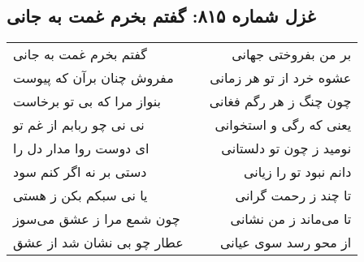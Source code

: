 \begin{center}
\section*{غزل شماره ۸۱۵: گفتم بخرم غمت به جانی}
\label{sec:815}
\begin{longtable}{l p{0.5cm} r}
گفتم بخرم غمت به جانی
&&
بر من بفروختی جهانی
\\
مفروش چنان برآن که پیوست
&&
عشوه خرد از تو هر زمانی
\\
بنواز مرا که بی تو برخاست
&&
چون چنگ ز هر رگم فغانی
\\
نی نی چو ربابم از غم تو
&&
یعنی که رگی و استخوانی
\\
ای دوست روا مدار دل را
&&
نومید ز چون تو دلستانی
\\
دستی بر نه اگر کنم سود
&&
دانم نبود تو را زیانی
\\
یا نی سبکم بکن ز هستی
&&
تا چند ز رحمت گرانی
\\
چون شمع مرا ز عشق می‌سوز
&&
تا می‌ماند ز من نشانی
\\
عطار چو بی نشان شد از عشق
&&
از محو رسد سوی عیانی
\\
\end{longtable}
\end{center}
